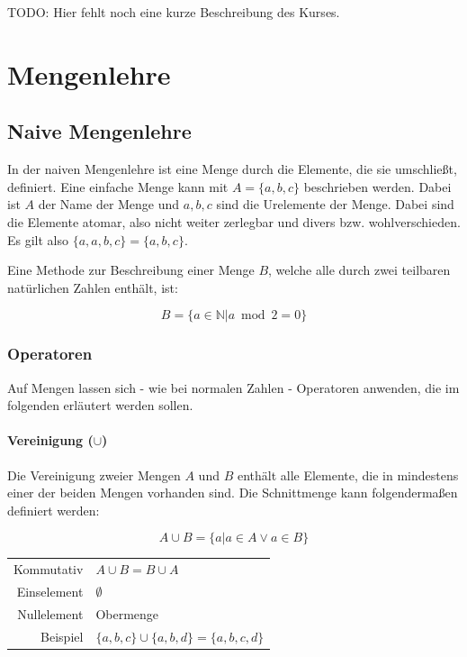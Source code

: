 \documentclass[../main.tex]{subfiles}
\begin{document}
    TODO: Hier fehlt noch eine kurze Beschreibung des Kurses.
    \clearpage

    \section{Mengenlehre}
    	\subsection{Naive Mengenlehre}
    	    In der naiven Mengenlehre ist eine Menge durch die Elemente, die sie umschließt, definiert.
            Eine einfache Menge kann mit $A = \{a, b, c\}$ beschrieben werden. Dabei ist $A$ der Name der Menge und $a, b, c$ sind die Urelemente der Menge. Dabei sind die Elemente atomar, also nicht weiter zerlegbar und divers bzw. wohlverschieden. Es gilt also $\{a, a, b, c\} = \{a, b, c\}$.
            
            Eine Methode zur Beschreibung einer Menge $B$, welche alle durch zwei teilbaren natürlichen Zahlen enthält, ist:
            
            \begin{equation}
                B = \{a \in \mathbb{N} | a \bmod 2 = 0\}
            \end{equation}
            
            \subsubsection{Operatoren}
                Auf Mengen lassen sich - wie bei normalen Zahlen - Operatoren anwenden, die im folgenden erläutert werden sollen.
                
                \paragraph{Vereinigung ($\cup$)}
                    Die Vereinigung zweier Mengen $A$ und $B$ enthält alle Elemente, die in mindestens einer der beiden Mengen vorhanden sind. Die Schnittmenge kann folgendermaßen definiert werden:
                    
                    \begin{equation}
                        A \cup B = \{a | a \in A \vee a \in B\}
                    \end{equation}
                    
                    \begin{tabular}{ r l }
						Kommutativ & $A \cup B = B \cup A$ \\
						Einselement & $\emptyset$ \\
						Nullelement & Obermenge \\
                    	Beispiel & $\{a, b, c\} \cup \{a, b, d\} = \{a, b, c, d\}$
					\end{tabular}
                    
\end{document}
